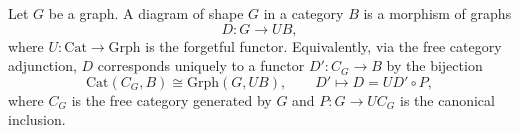 Let $G$ be a graph. A diagram of shape $G$ in a category $B$ is a morphism of graphs
$$D : G \to UB,$$
where $U : \text{Cat} \to \text{Grph}$ is the forgetful functor. Equivalently, via the free category adjunction, $D$ corresponds uniquely to a functor $D' : C_G \to B$ by the bijection
$$\text{Cat}(C_G, B) \cong \text{Grph}(G, UB), \qquad D' \mapsto D = UD' \circ P,$$
where $C_G$ is the free category generated by $G$ and $P : G \to UC_G$ is the canonical inclusion.
